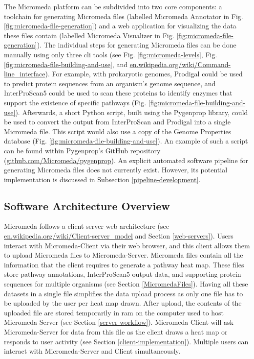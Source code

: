 The Micromeda platform can be subdivided into two core components: a 
toolchain for generating Micromeda files (labelled Micromeda Annotator in Fig. 
\ref{fig:micromeda-file-generation}) and a web application for visualizing the 
data these files contain (labelled Micromeda Visualizer in Fig. 
\ref{fig:micromeda-file-generation}). The individual steps for generating 
Micromeda files can be done manually using only three \gls{cli} tools (see Fig. 
\ref{fig:micromeda-levels}, Fig. \ref{fig:micromeda-file-building-and-use}, and  
\href{http://en.wikipedia.org/wiki/Command-line_interface}{en.wikipedia.org/wiki/Command-line\_interface}). 
For example, with prokaryotic genomes, Prodigal could be used to predict protein 
sequences from an organism's genome sequence, and InterProScan5 could be used to 
scan these proteins to identify enzymes that support the existence of specific 
pathways (Fig. \ref{fig:micromeda-file-building-and-use}). Afterwards, a short 
Python script, built using the Pygenprop library, could be used to convert the 
output from InterProScan and Prodigal into a single Micromeda file. This script 
would also use a copy of the Genome Properties database (Fig. 
\ref{fig:micromeda-file-building-and-use}). An example of such a script can be 
found within Pygenprop's GitHub repository 
(\href{http://github.com/Micromeda/pygenprop}{github.com/Micromeda/pygenprop}). 
An explicit automated software pipeline for generating Micromeda files does not 
currently exist. However, its potential implementation is discussed in 
Subsection \ref{pipeline-development}.


\subsection{Software Architecture Overview}

Micromeda follows a client-server web architecture \cite{svobodova1985client} 
(see 
\href{http://en.wikipedia.org/wiki/Client-server_model}{en.wikipedia.org/wiki/Client-server\_model} 
and Section \ref{web-servers}). Users interact with Micromeda-Client via their 
web browser, and this client allows them to upload Micromeda files to 
Micromeda-Server. Micromeda files contain all the information that the client 
requires to generate a pathway heat map. These files store pathway annotations, 
InterProScan5 output data, and supporting protein sequences for multiple 
organisms (see Section \ref{MicromedaFiles}). Having all these datasets in a 
single file simplifies the data upload process as only one file has to be 
uploaded by the user per heat map drawn. After upload, the contents of the 
uploaded file are stored temporarily in \gls{ram} on the computer used to host 
Micromeda-Server (see Section \ref{server-workflow}). Micromeda-Client will ask 
Micromeda-Server for data from this file as the client draws a heat map or 
responds to user activity (see Section \ref{client-implementation}). Multiple 
users can interact with Micromeda-Server and Client simultaneously.

